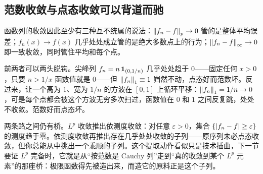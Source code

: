 \subsection{范数收敛与点态收敛可以背道而驰}

函数列的收敛因此至少有三种互不统属的说法：\(\left\lVert f_n-f\right\rVert_p\to0\) 管的是整体平均误差；\(f_n(x)\to f(x)\) 几乎处处成立管的是绝大多数点上的行为；\(\left\lVert f_n-f\right\rVert_\infty\to0\) 即一致收敛，同时管住平均和每个点。

前两者可以两头脱钩。尖峰列 \(f_n=n\,\mathbf{1}_{(0,1/n)}\) 几乎处处趋于 \(0\)——固定任何 \(x>0\)，只要 \(n>1/x\) 函数值就是 \(0\)——但 \(\left\lVert f_n\right\rVert_1\equiv1\) 岿然不动，点态好而范数坏。反过来，让一个高为 \(1\)、宽为 \(1/n\) 的方波在 \([0,1]\) 上循环平移：\(\left\lVert f_n\right\rVert_1=1/n\to0\)，可是每个点都会被这个方波无穷多次扫过，函数值在 \(0\) 和 \(1\) 之间反复跳，处处不收敛。范数好而点态坏。

两条路之间仍有桥。\(L^p\) 收敛推出依测度收敛：对任意 \(\varepsilon>0\)，集合 \(\left\{|f_n-f|\ge\varepsilon\right\}\) 的测度趋于零。依测度收敛再推出存在几乎处处收敛的子列——原序列未必点态收敛，但你总能从中挑出一个乖顺的子列。这个提取动作看似只是技术插曲，下一节要证 \(L^p\) 完备时，它就是从``按范数是 Cauchy 列''走到``真的收敛到某个 \(L^p\) 元素''的那座桥：极限函数得先被造出来，而造它的原料正是这个子列。
